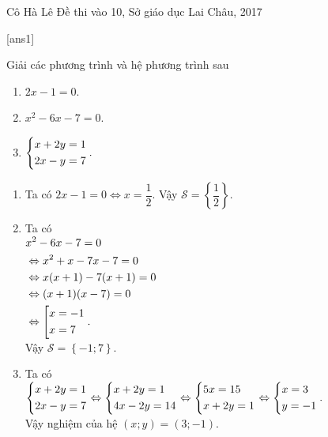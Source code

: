 \begin{name}
{Cô Hà Lê}
{Đề thi vào 10, Sở giáo dục Lai Châu, 2017}
\end{name}
\setcounter{ex}{0}
[ans1]
\begin{ex}%
 Giải các phương trình và hệ phương trình sau
\begin{enumerate}
        	\item $2x-1=0$.
        	\item $x^2-6x-7=0$.
	\item $\left\{\begin{aligned}&x+2y=1 \\ &2x-y=7\end{aligned}\right..$
\end{enumerate}
\loigiai
    {
 \begin{enumerate}
       \item Ta có $2x-1=0 \Leftrightarrow x=\dfrac{1}{2}$. Vậy $\mathcal{S}= \left\{\dfrac{1}{2} \right\}$.
       \item Ta có \\
$\begin{aligned}
& x^2-6x-7= 0\\ 
& \Leftrightarrow x^2+x-7x-7 =0 \\
& \Leftrightarrow x(x+1) -7(x+1)=0\\
& \Leftrightarrow (x+1)(x-7)=0\\
& \Leftrightarrow \left[\begin{aligned}& x=-1 \\ &x=7\end{aligned}\right..
\end{aligned}$\\
Vậy $\mathcal{S}= \left\{-1;7 \right\}$.
\item  Ta có \\
$ \left\{\begin{aligned}&x+2y=1 \\ &2x-y=7\end{aligned}\right. \Leftrightarrow \left\{\begin{aligned}&x+2y=1 \\ &4x-2y=14\end{aligned}\right.
 \Leftrightarrow \left\{\begin{aligned}&5x =15 \\ &x+2y=1\end{aligned}\right.\Leftrightarrow \left\{\begin{aligned}&x=3 \\&y=-1\end{aligned}\right..
$\\
Vậy nghiệm của hệ $(x;y)=(3;-1)$.
\end{enumerate}
    }
\end{ex}

